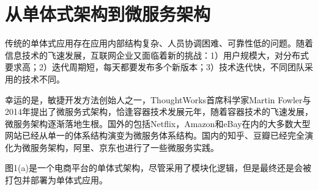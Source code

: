 \documentclass[10.5pt,twocolumn]{jbuaa}
\begin{document}
\section{从单体式架构到微服务架构}
传统的单体式应用存在应用内部结构复杂、人员协调困难、可靠性低的问题。随着信息技术的飞速发展，互联网企业又面临着新的挑战：1）用户规模大，对分布式要求高；2）迭代周期短，每天都要发布多个新版本；3）技术迭代快，不同团队采用的技术不同。

幸运的是，敏捷开发方法创始人之一，ThoughtWorks首席科学家Martin Fowler与2014年提出了微服务式架构，恰逢容器技术发展元年，随着容器技术的飞速发展，微服务架构逐渐落地生根。国外的包括Netflix，Amazon和eBay在内的大多数大型网站已经从单一的体系结构演变为微服务体系结构。国内的知乎、豆瓣已经完全演化为微服务架构，阿里、京东也进行了一些微服务实践。

图1(a)是一个电商平台的单体式架构，尽管采用了模块化逻辑，但是最终还是会被打包并部署为单体式应用。
\end{document}
